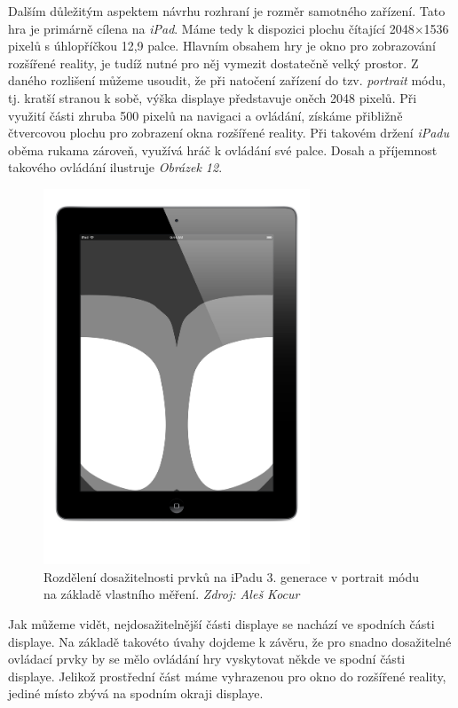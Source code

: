 \documentclass[twoside,12pt]{article}
\begin{document}
Dalším důležitým aspektem návrhu rozhraní je rozměr samotného zařízení. Tato hra je primárně cílena na \textit{iPad}. Máme tedy k dispozici plochu čítající 2048$\times$1536 pixelů s úhlopříčkou 12,9 palce. Hlavním obsahem hry je okno pro zobrazování rozšířené reality, je tudíž nutné pro něj vymezit dostatečně velký prostor. Z daného rozlišení můžeme usoudit, že při natočení zařízení do tzv. \textit{portrait} módu, tj. kratší stranou k sobě, výška displaye představuje oněch 2048 pixelů. Při využití části zhruba 500 pixelů na navigaci a ovládání, získáme přibližně čtvercovou plochu pro zobrazení okna rozšířené reality. Při takovém držení \textit{iPadu} oběma rukama zároveň, využívá hráč k ovládání své palce. Dosah a příjemnost takového ovládání ilustruje \textit{Obrázek 12}.

\begin{figure}[H]
\centering
    \includegraphics[width=300px, center]{images/ipad-toucharea.png}
\captionsetup{justification=centering}
    \caption[]{Rozdělení dosažitelnosti prvků na iPadu 3. generace v portrait módu na základě vlastního měření. \textit{Zdroj: Aleš Kocur}}
    \label{class_diagram}
\end{figure}

Jak můžeme vidět, nejdosažitelnější části displaye se nachází ve spodních části displaye. Na základě takovéto úvahy dojdeme k závěru, že pro snadno dosažitelné ovládací prvky by se mělo ovládání hry vyskytovat někde ve spodní části displaye. Jelikož prostřední část máme vyhrazenou pro okno do rozšířené reality, jediné místo zbývá na spodním okraji displaye. 
\end{document}
